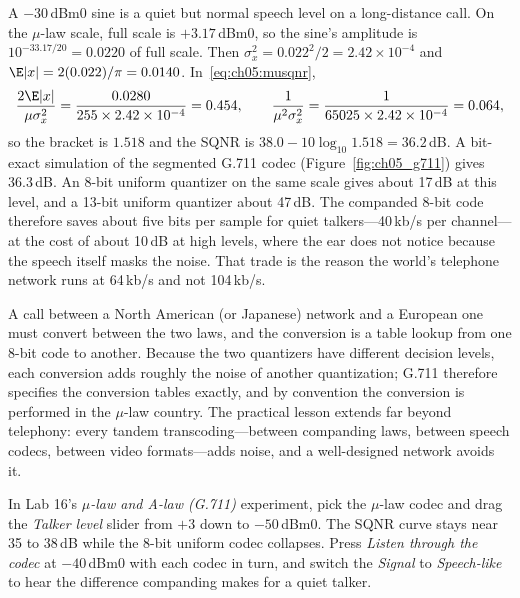 \begin{worked}
A $-30$\,dBm0 sine is a quiet but normal speech level on a long-distance call. On the
$\mu$-law scale, full scale is $+3.17$\,dBm0, so the sine's amplitude is
$10^{-33.17/20}=0.0220$ of full scale. Then $\sigma_x^2=0.022^2/2=2.42\times10^{-4}$ and
$\E|x|=2(0.022)/\pi=0.0140$. In~\eqref{eq:ch05:musqnr},
\[
\frac{2\E|x|}{\mu\sigma_x^2}=\frac{0.0280}{255\times2.42\times10^{-4}}=0.454,\qquad
\frac{1}{\mu^2\sigma_x^2}=\frac{1}{65025\times2.42\times10^{-4}}=0.064,
\]
so the bracket is $1.518$ and the SQNR is $38.0-10\log_{10}1.518=36.2$\,dB. A bit-exact
simulation of the segmented G.711 codec (Figure~\ref{fig:ch05_g711}) gives 36.3\,dB. An 8-bit
uniform quantizer on the same scale gives about 17\,dB at this level, and a 13-bit uniform
quantizer about 47\,dB. The companded 8-bit code therefore saves about five bits per sample
for quiet talkers---40\,kb/s per channel---at the cost of about 10\,dB at high levels, where the
ear does not notice because the speech itself masks the noise. That trade is the reason the
world's telephone network runs at 64\,kb/s and not 104\,kb/s.
\end{worked}

\begin{pitfall}
A call between a North American (or Japanese) network and a European one must convert between
the two laws, and the conversion is a table lookup from one 8-bit code to another. Because the
two quantizers have different decision levels, each conversion adds roughly the noise of
another quantization; G.711 therefore specifies the conversion tables exactly, and by
convention the conversion is performed in the $\mu$-law country. The practical lesson extends far beyond telephony: every tandem
transcoding---between companding laws, between speech codecs, between video formats---adds
noise, and a well-designed network avoids it.
\end{pitfall}

\begin{tryit}
In Lab 16's \emph{$\mu$-law and A-law (G.711)} experiment, pick the $\mu$-law codec and drag the
\emph{Talker level} slider from $+3$ down to $-50$\,dBm0. The SQNR curve stays near 35 to 38\,dB
while the 8-bit uniform codec collapses. Press \emph{Listen through the codec} at $-40$\,dBm0 with
each codec in turn, and switch the \emph{Signal} to \emph{Speech-like} to hear the difference
companding makes for a quiet talker.
\end{tryit}


